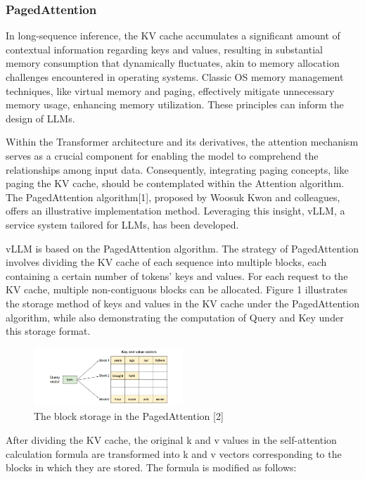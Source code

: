 \documentclass[conference]{IEEEtran}
\begin{document}
\subsubsection{PagedAttention}
In long-sequence inference, the KV cache accumulates a significant amount of contextual information regarding keys and values, resulting in substantial memory consumption that dynamically fluctuates, akin to memory allocation challenges encountered in operating systems. Classic OS memory management techniques, like virtual memory and paging, effectively mitigate unnecessary memory usage, enhancing memory utilization. These principles can inform the design of LLMs.

Within the Transformer architecture and its derivatives, the attention mechanism serves as a crucial component for enabling the model to comprehend the relationships among input data. Consequently, integrating paging concepts, like paging the KV cache, should be contemplated within the Attention algorithm. The PagedAttention algorithm[1], proposed by Woosuk Kwon and colleagues, offers an illustrative implementation method. Leveraging this insight, vLLM, a service system tailored for LLMs, has been developed.

vLLM is based on the PagedAttention algorithm. The strategy of PagedAttention involves dividing the KV cache of each sequence into multiple blocks, each containing a certain number of tokens' keys and values. For each request to the KV cache, multiple non-contiguous blocks can be allocated. Figure 1 illustrates the storage method of keys and values in the KV cache under the PagedAttention algorithm, while also demonstrating the computation of Query and Key under this storage format.

\begin{figure}[htbp]
    \centerline{\includegraphics[width=0.5\textwidth]{process figM1.png}}
    \caption{The block storage in the PagedAttention [2]}
    \label{fig}
\end{figure}

After dividing the KV cache, the original k and v values in the self-attention calculation formula are transformed into k and v vectors corresponding to the blocks in which they are stored. The formula is modified as follows:
\end{document}
